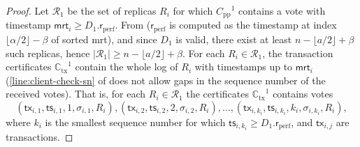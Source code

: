 \documentclass[pdflatex,sn-mathphys-num]{sn-jnl}%
\theoremstyle{thmstyleone}%
\theoremstyle{thmstyletwo}%
\theoremstyle{thmstylethree}%
\newcommand{\podtm}{\textsf{pod}\xspace}
\newcommand{\CR}{\ensuremath{\mathcal{R}}\xspace}
\newcommand{\operand}[1]{\textsf{#1}}
\newcommand{\tx}{\operand{tx}\xspace}
\newcommand{\round}{\operand{r}\xspace}
\newcommand{\client}{\operand{c}\xspace}
\newcommand{\rperf}{\ensuremath{\round_\text{perf}}\xspace}
\newcommand{\rep}{\ensuremath{R}\xspace}
\newcommand{\allreps}{\CR}
\newcommand{\mrt}{\operand{mrt}\xspace}
\newcommand{\tsp}{\operand{ts}\xspace}
\newcommand{\alltxcert}{\ensuremath{\mathbb{C}_\text{tx}}\xspace}
\newcommand{\ppcert}{\ensuremath{C_\text{pp}}\xspace}
\newcommand{\txSet}{\operand{T}\xspace}
\newcommand{\Pod}{\ensuremath{D}\xspace}
\newcommand{\zo}{\ensuremath{\{ 0, 1\}\xspace}}
\let\oldalpha\alpha
\renewcommand{\alpha}{\ensuremath{\oldalpha}\xspace}
\let\oldbeta\beta
\renewcommand{\beta}{\ensuremath{\oldbeta}\xspace}
\begin{document}
\begin{appendices}
\begin{proof}
	Let $\allreps_1$ be the set of replicas $\rep_i$ for which $\ppcert^1$ contains a vote with timestamp $\mrt_i \geq \Pod_1.\rperf$.
	From  (\rperf is computed as the timestamp at index $\lfloor \alpha / 2 \rfloor - \beta$ of sorted \mrt), and since $\Pod_1$ is valid, there exist at least $n - \lfloor a/2 \rfloor + \beta$ such replicas, hence $|\allreps_1| \geq n - \lfloor a/2 \rfloor + \beta$.
	For each $\rep_i \in \allreps_1$, the transaction certificates $\alltxcert^1$ contain the whole log of $\rep_i$ with timestamps up to $\mrt_i$ (\cref{line:client-check-sn} of  does not allow gaps in the sequence number of the received votes).
	That is, for each $\rep_i \in \allreps_1$ the certificates $\alltxcert^1$ contains votes
	\begin{equation}\label{eq:proof-pp-set1}
		(\tx_{i,1}, \tsp_{i,1}, 1, \sigma_{i,1}, \rep_i), (\tx_{i,2}, \tsp_{i,2}, 2, \sigma_{i,2}, \rep_i), \ldots, (\tx_{i,k_i}, \tsp_{i, k_i}, k_i, \sigma_{i, k_i}, \rep_i),
	\end{equation}
	where $k_i$ is the smallest sequence number for which $\tsp_{i, k_i} \geq \Pod_1.\rperf$, and $\tx_{i,j}$ are transactions.


\end{proof}
\end{appendices}
\end{document}
